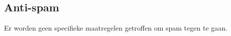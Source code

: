 \subsection{Anti-spam}\label{antispam}

Er worden geen specifieke maatregelen getroffen om spam tegen te gaan. 
